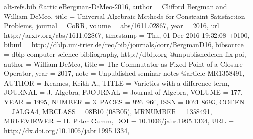 \begin{filecontents*}{alt-refs.bib}
@article{Bergman-DeMeo-2016,
  author    = {Clifford Bergman and William DeMeo},
  title     = {Universal Algebraic Methods for Constraint Satisfaction Problems},
  journal   = {CoRR},
  volume    = {abs/1611.02867},
  year      = {2016},
  url       = {http://arxiv.org/abs/1611.02867},
  timestamp = {Thu, 01 Dec 2016 19:32:08 +0100},
  biburl    = {http://dblp.uni-trier.de/rec/bib/journals/corr/BergmanD16},
  bibsource = {dblp computer science bibliography, http://dblp.org}
}
@unpublished{com-fix-poi,
  author    = {William DeMeo},
  title     = {The Commutator as Fixed Point of a Closure Operator},
  year      = {2017},
  note = {Unpublished seminar notes}
}
@article {MR1358491,
    AUTHOR = {Kearnes, Keith A.},
     TITLE = {Varieties with a difference term},
   JOURNAL = {J. Algebra},
  FJOURNAL = {Journal of Algebra},
    VOLUME = {177},
      YEAR = {1995},
    NUMBER = {3},
     PAGES = {926--960},
      ISSN = {0021-8693},
     CODEN = {JALGA4},
   MRCLASS = {08B10 (08B05)},
  MRNUMBER = {1358491},
MRREVIEWER = {H. Peter Gumm},
       DOI = {10.1006/jabr.1995.1334},
       URL = {http://dx.doi.org/10.1006/jabr.1995.1334},
}
\end{filecontents*}
\documentclass[12pt]{amsart}

